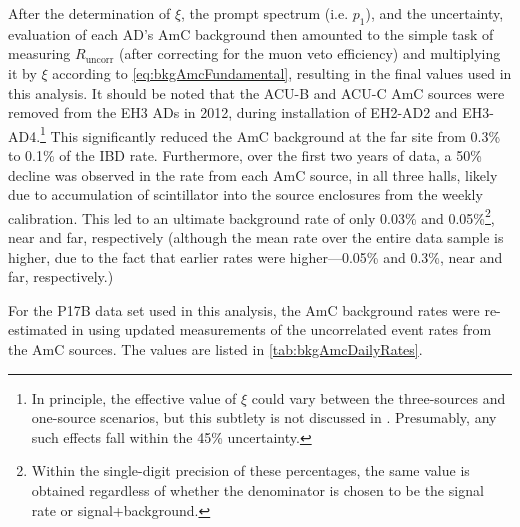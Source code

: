 \documentclass[../thesis.tex]{subfiles}
\begin{document}
After the determination of $\xi$, the prompt spectrum (i.e. $p_1$), and the uncertainty, evaluation of each AD's AmC background then amounted to the simple task of measuring $R_{\mathrm{uncorr}}$ (after correcting for the muon veto efficiency) and multiplying it by $\xi$ according to \autoref{eq:bkgAmcFundamental}, resulting in the final values used in this analysis. It should be noted that the ACU-B and ACU-C AmC sources were removed from the EH3 ADs in 2012, during installation of EH2-AD2 and EH3-AD4.\footnote{In principle, the effective value of $\xi$ could vary between the three-sources and one-source scenarios, but this subtlety is not discussed in \cite{Gu_2016}. Presumably, any such effects fall within the 45\% uncertainty.} This significantly reduced the AmC background at the far site from 0.3\% to 0.1\% of the IBD rate. Furthermore, over the first two years of data, a 50\% decline was observed in the rate from each AmC source, in all three halls, likely due to accumulation of scintillator into the source enclosures from the weekly calibration. This led to an ultimate background rate of only 0.03\% and 0.05\%\footnote{Within the single-digit precision of these percentages, the same value is obtained regardless of whether the denominator is chosen to be the signal rate or signal+background.}, near and far, respectively (although the mean rate over the entire data sample is higher, due to the fact that earlier rates were higher---0.05\% and 0.3\%, near and far, respectively.)

For the P17B data set used in this analysis, the AmC background rates were re-estimated in \cite{lianghongBkg} using updated measurements of the uncorrelated event rates from the AmC sources. The values are listed in \autoref{tab:bkgAmcDailyRates}.

\begin{table}[ht]
  \caption{AmC background rates for the P17B data set \cite{lianghongBkg}.}
  \label{tab:bkgAmcDailyRates}
\end{table}
\end{document}
